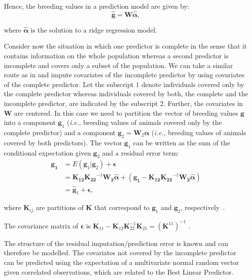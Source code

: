 \documentclass[12pt,titlepage]{article}
\begin{document}
Hence, the breeding values in a prediction model are given by:
\begin{equation} \label{eq:mrnaebv}
	\mathbf{\hat{g}} = \mathbf{W}\boldsymbol{\hat{\alpha}},
\end{equation}

where $\boldsymbol{\hat{\alpha}}$ is the solution to a ridge regression model.

Consider now the situation in which one predictor is complete in the sense that
it contains information on the whole population whereas a second predictor is
incomplete and covers only a subset of the population.
We can take a similar route as in  and impute covariates 
of the incomplete predictor by using covariates of the complete predictor.
Let the subscript $1$ denote individuals covered only by the complete
predictor whereas individuals covered by both, the complete and the
incomplete predictor, are indicated by the subscript $2$.
Further, the covariates in $\mathbf{W}$ are centered.
In this case we need to partition the vector of breeding values $\mathbf{g}$
into a component $\mathbf{g}_{1}$ (\textit{i.e.,} breeding values of animals 
covered only by the complete predictor) and a component 
$\mathbf{g}_{2} = \mathbf{W}_{2}\boldsymbol{\alpha}$ (\textit{i.e.,} breeding 
values of animals covered by both predictors).
The vector $\mathbf{g}_1$ can be written as the sum of the conditional 
expectation given $\mathbf{g}_2$ and a residual error term:
\begin{align} \label{eq:mrna1}
	\mathbf{g_1} &= E(\mathbf{g}_1|\mathbf{g}_2) + \boldsymbol{\epsilon} \\
	&= \mathbf{K_{12}}\mathbf{K_{22}}^{-1}\mathbf{W_2}\boldsymbol{\hat{\alpha}} + (\mathbf{g_1} - \mathbf{K_{12}}\mathbf{K_{22}}^{-1}\mathbf{W_2}\boldsymbol{\hat{\alpha}}) \\
	&= \mathbf{\hat{g}}_1 + \boldsymbol{\epsilon},
\end{align}

where $\mathbf{K}_{ij}$ are partitions of $\mathbf{K}$ that correspond to 
$\mathbf{g}_{1}$ and $\mathbf{g}_{2}$, respectively~\cite{Fernando2014}.

The covariance matrix of $\boldsymbol{\epsilon}$ is $\mathbf{K}_{11} - \mathbf{K}_{12}\mathbf{K}_{22}^{-1}\mathbf{K}_{21} = (\mathbf{K}^{11})^{-1}$
\cite{Legarra2009}.

The structure of the residual imputation/prediction error is known and can 
therefore be modelled.
The covariates not covered by the incomplete predictor can be predicted using 
the expectation of a multivariate normal random vector given correlated 
observations, which are related to the Best Linear Predictor.
\end{document}
